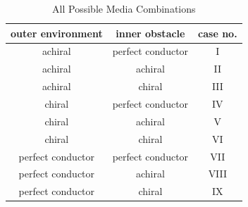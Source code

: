 \begin{table}
  \centering
  \caption{All Possible Media Combinations}\label{tbl:all}
  \renewcommand{\arraystretch}{1.1}
  \begin{tabular}{@{}ccc@{}}
    \toprule
    \textbf{outer environment} & \textbf{inner obstacle} & \textbf{case no.} \\
    \midrule
    achiral           & perfect conductor & I     \\
    achiral           & achiral           & II    \\
    achiral           & chiral            & III   \\
    chiral            & perfect conductor & IV    \\
    chiral            & achiral           & V     \\
    chiral            & chiral            & VI    \\
    perfect conductor & perfect conductor & VII   \\
    perfect conductor & achiral           & VIII  \\
    perfect conductor & chiral            & IX    \\
    \bottomrule
  \end{tabular}
\end{table}

